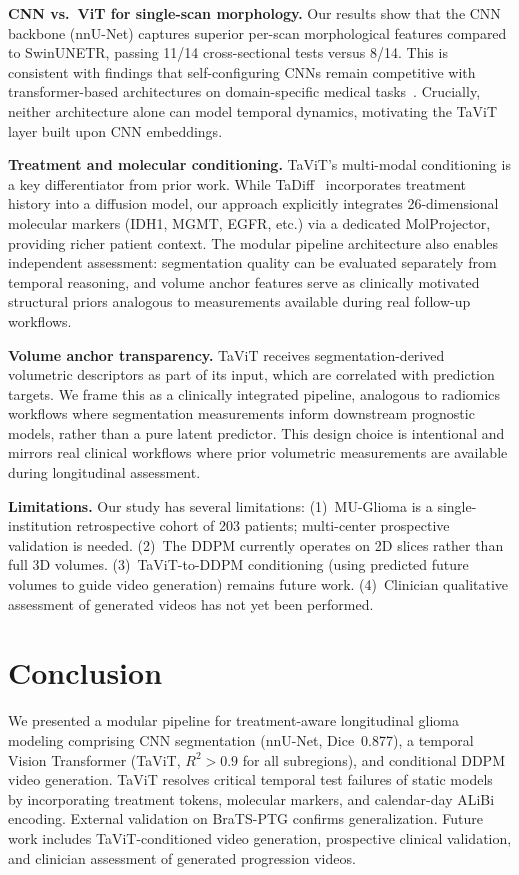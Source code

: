 \documentclass[conference]{IEEEtran}
\begin{document}
\textbf{CNN vs.\ ViT for single-scan morphology.}
Our results show that the CNN backbone (nnU-Net) captures superior per-scan morphological features compared to SwinUNETR, passing 11/14 cross-sectional tests versus 8/14. This is consistent with findings that self-configuring CNNs remain competitive with transformer-based architectures on domain-specific medical tasks~\cite{isensee2021nnunet}. Crucially, neither architecture alone can model temporal dynamics, motivating the TaViT layer built upon CNN embeddings.

\textbf{Treatment and molecular conditioning.}
TaViT's multi-modal conditioning is a key differentiator from prior work. While TaDiff~\cite{liu2023tadiff} incorporates treatment history into a diffusion model, our approach explicitly integrates 26-dimensional molecular markers (IDH1, MGMT, EGFR, etc.) via a dedicated MolProjector, providing richer patient context. The modular pipeline architecture also enables independent assessment: segmentation quality can be evaluated separately from temporal reasoning, and volume anchor features serve as clinically motivated structural priors analogous to measurements available during real follow-up workflows.

\textbf{Volume anchor transparency.}
TaViT receives segmentation-derived volumetric descriptors as part of its input, which are correlated with prediction targets. We frame this as a clinically integrated pipeline, analogous to radiomics workflows where segmentation measurements inform downstream prognostic models, rather than a pure latent predictor. This design choice is intentional and mirrors real clinical workflows where prior volumetric measurements are available during longitudinal assessment.

\textbf{Limitations.}
Our study has several limitations: (1)~MU-Glioma is a single-institution retrospective cohort of 203 patients; multi-center prospective validation is needed. (2)~The DDPM currently operates on 2D slices rather than full 3D volumes. (3)~TaViT-to-DDPM conditioning (using predicted future volumes to guide video generation) remains future work. (4)~Clinician qualitative assessment of generated videos has not yet been performed.


\section{Conclusion}
\label{sec:conclusion}

We presented a modular pipeline for treatment-aware longitudinal glioma modeling comprising CNN segmentation (nnU-Net, Dice~0.877), a temporal Vision Transformer (TaViT, $R^2 > 0.9$ for all subregions), and conditional DDPM video generation. TaViT resolves critical temporal test failures of static models by incorporating treatment tokens, molecular markers, and calendar-day ALiBi encoding. External validation on BraTS-PTG confirms generalization. Future work includes TaViT-conditioned video generation, prospective clinical validation, and clinician assessment of generated progression videos.




\end{document}
